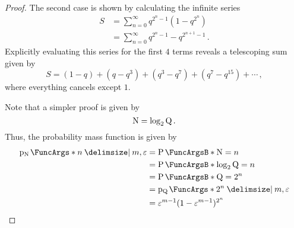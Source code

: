 \documentclass[ ../main.tex]{subfiles}
\begin{document}
\begin{proof}
The second case is shown by calculating the infinite series
\begin{align}
    S &= \sum_{n=0}^{\infty} q^{2^n-1}\left(1-q^{2^n}\right)\\
      &= \sum_{n=0}^{\infty} q^{2^n-1} - q^{2^{n+1}-1}\,.
\end{align}
Explicitly evaluating this series for the first $4$ terms reveals a telescoping sum given by
\begin{equation}
    S = (1 - q) + (q - q^3) + (q^3 - q^7) + (q^7 - q^{15}) + \cdots\,,
\end{equation}
where everything cancels except $1$.

Note that a simpler proof is given by
\begin{equation}
    \mathrm{N} = \log_2 \mathrm{Q}\,.
\end{equation}
Thus, the probability mass function is given by
\begin{align}
    \PDF{n \Given m,\fprate}[\RV{N}]
        &= \Prob{\RV{N} = n}\\
        &= \Prob{\log_2 \RV{Q} = n}\\
        &= \Prob{\RV{Q} = 2^n}\\
        &= \PDF{2^n \Given m, \fprate}[\RV{Q}]\\
        &= \fprate^{m-1} (1 - \fprate^{m-1})^{2^n}
\end{align}
\end{proof}
\end{document}
